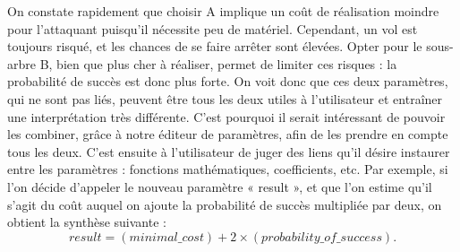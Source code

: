 			On constate rapidement que choisir A implique un coût de réalisation moindre pour l'attaquant puisqu'il nécessite peu de matériel. Cependant, un vol est toujours risqué, et les chances de se faire arrêter sont élevées. Opter pour le sous-arbre B, bien que plus cher à réaliser, permet de limiter ces risques : la probabilité de succès est donc plus forte. On voit donc que ces deux paramètres, qui ne sont pas liés, peuvent être tous les deux utiles à l'utilisateur et entraîner une interprétation très différente. C'est pourquoi il serait intéressant de pouvoir les combiner, grâce à notre éditeur de paramètres, afin de les prendre en compte tous les deux. C'est ensuite à l'utilisateur de juger des liens qu'il désire instaurer entre les paramètres : fonctions mathématiques, coefficients, etc. Par exemple, si l'on décide d'appeler le nouveau paramètre « result », et que l'on estime qu'il s'agit du coût auquel on ajoute la probabilité de succès multipliée par deux, on obtient la synthèse suivante : \[ result = (minimal\_cost) + 2 \times (probability\_of\_success).\]
